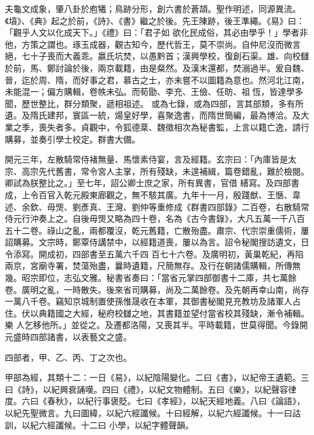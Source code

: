 
\begin{pinyinscope}

 夫龜文成象，肇八卦於庖犧；鳥跡分形，創六書於蒼頡。聖作明述，同源異流。《墳》、《典》起之於前，《詩》、《書》繼之於後。先王陳跡，後王準繩。《易》曰：「觀乎人文以化成天下。」《禮》曰：「君子如
 欲化民成俗，其必由學乎！」學者非他，方策之謂也。琢玉成器，觀古知今，歷代哲王，莫不崇尚。自仲尼沒而微言絕，七十子喪而大義乖。嬴氏坑焚，以愚黔首；漢興學校，復創石渠。雄、向校讎於前，馬、鄭討論於後，兩京載籍，由是粲然。及漢末還都，焚溺過半。爰自魏、晉，迄於周、隋，而好事之君，慕古之士，亦未嘗不以圖籍為意也。然河北江南，未能混一；偏方購輯，卷帙未弘。而荀勖、李充、王儉、任昉、祖恆，皆達學多聞，歷世整比，群分類聚，遞相祖述。
 或為七錄，或為四部，言其部類，多有所遺。及隋氏建邦，寰區一統，煬皇好學，喜聚逸書，而隋世簡編，最為博洽。及大業之季，喪失者多。貞觀中，令狐德棻、魏徵相次為秘書監，上言以籍亡逸，請行購募，並奏引學士校定。群書大備。



 開元三年，左散騎常侍褚無量、馬懷素侍宴，言及經籍。玄宗曰：「內庫皆是太宗、高宗先代舊書，常令宮人主掌，所有殘缺，未遑補緝，篇卷錯亂，難於檢閱。卿試為朕整比之。」至七年，詔公卿士庶之家，所有異書，官借
 繕寫。及四部書成，上令百官入乾元殿東廊觀之，無不駭其廣。九年十一月，殷踐猷、王愜、韋述、余欽、毋煚、劉彥真、王灣、劉仲等重修成《群書四部錄》二百卷，右散騎常侍元行沖奏上之。自後毋煚又略為四十卷，名為《古今書錄》，大凡五萬一千八百五十二卷。祿山之亂，兩都覆沒，乾元舊籍，亡散殆盡。肅宗、代宗崇重儒術，屢詔購募。文宗時，鄭覃侍講禁中，以經籍道喪，屢以為言。詔令秘閣搜訪遺文，日令添寫。開成初，四部書至五萬六千四
 百七十六卷。及廣明初，黃巢乾紀，再陷兩京，宮廟寺署，焚蕩殆盡，曩時遺籍，尺簡無存。及行在朝諸儒購輯，所傳無幾。昭宗即位，志弘文雅。秘書省奏曰：「當省元掌四部御書十二庫，共七萬餘卷。廣明之亂，一時散失。後來省司購募，尚及二萬餘卷。及先朝再幸山南，尚存一萬八千卷。竊知京城制置使孫惟晟收在本軍，其御書秘閣見充教坊及諸軍人占住。伏以典籍國之大經，秘府校讎之地，其書籍並望付當省校其殘缺，漸令補輯。樂
 人乞移他所。」並從之。及遷都洛陽，又喪其半。平時載籍，世莫得聞。今錄開元盛時四部諸書，以表藝文之盛。



 四部者，甲、乙、丙、丁之次也。



 甲部為經，其類十二：一日《易》，以紀陰陽變化。二曰《書》，以紀帝王遺範。三曰《詩》，以紀興衰誦嘆。四曰《禮》，以紀文物體制。五曰《樂》，以紀聲容律度。六曰《春秋》，以紀行事褒貶。七曰《孝經》，以紀天經地義。八曰《論語》，以紀先聖微言。九曰圖緯，以紀六經讖候。十曰經解，以紀六經讖候。十一曰詁訓，以紀六經讖候。十二曰
 小學，以紀字體聲韻。




\end{pinyinscope}
